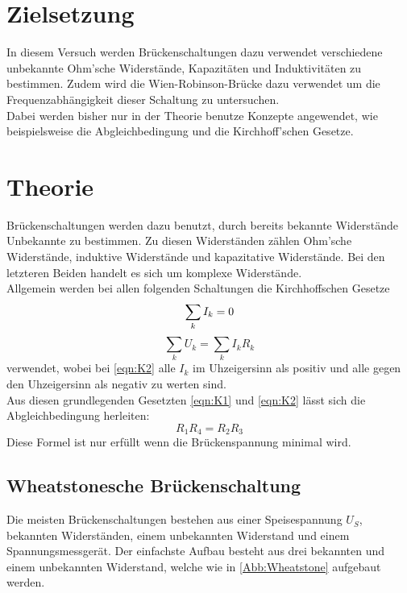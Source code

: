 \section{Zielsetzung}
\label{sec:Zielsetzung}
In diesem Versuch werden Brückenschaltungen dazu verwendet verschiedene unbekannte Ohm'sche Widerstände, Kapazitäten und Induktivitäten
zu bestimmen. Zudem wird die Wien-Robinson-Brücke dazu verwendet um die Frequenzabhängigkeit dieser Schaltung zu untersuchen. \\
Dabei werden bisher nur in der Theorie benutze Konzepte angewendet, wie beispielsweise die Abgleichbedingung und die Kirchhoff'schen Gesetze.

\section{Theorie}
\label{sec:Theorie}

Brückenschaltungen werden dazu benutzt, durch bereits bekannte Widerstände Unbekannte zu bestimmen. Zu diesen Widerständen zählen
Ohm'sche Widerstände, induktive Widerstände und kapazitative Widerstände. Bei den letzteren Beiden handelt es sich um komplexe
Widerstände. \\
Allgemein werden bei allen folgenden Schaltungen die Kirchhoffschen Gesetze
\begin{equation}
    \sum_k I_k = 0 \\ \label{eqn:K1}
\end{equation}
\begin{equation}
    \sum_k U_k = \sum_k I_k R_k \label{eqn:K2}
\end{equation}
verwendet, wobei bei \autoref{eqn:K2} alle $I_k$ im Uhzeigersinn als positiv und alle gegen den Uhzeigersinn als negativ zu werten sind. \\
Aus diesen grundlegenden Gesetzten \autoref{eqn:K1} und \autoref{eqn:K2} lässt sich die Abgleichbedingung herleiten:
\begin{equation}
    R_1 R_4 = R_2 R_3
\end{equation}
Diese Formel ist nur erfüllt wenn die Brückenspannung minimal wird.
\\

\subsection{Wheatstonesche Brückenschaltung}
 
Die meisten Brückenschaltungen bestehen aus einer Speisespannung $U_S$, bekannten Widerständen, einem unbekannten Widerstand und einem Spannungsmessgerät.
Der einfachste Aufbau besteht aus drei bekannten und einem unbekannten Widerstand, welche wie in \autoref{Abb:Wheatstone} aufgebaut werden.

